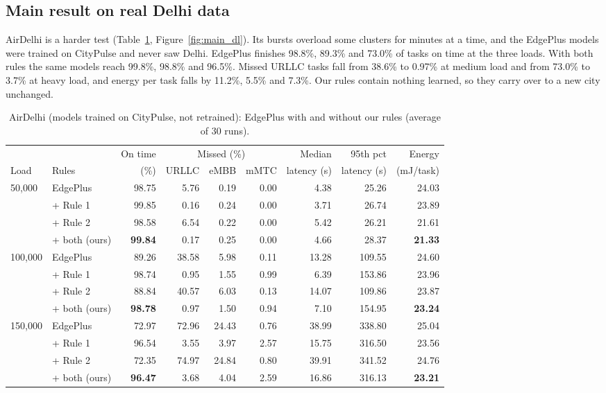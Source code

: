 \documentclass[11pt]{article}
\newcommand{\botrule}{\bottomrule}
\theoremstyle{definition}
\begin{document}
\subsection{Main result on real Delhi data}
AirDelhi is a harder test (Table~\ref{tab:main_dl}, Figure~\ref{fig:main_dl}). Its bursts overload some clusters
for minutes at a time, and the EdgePlus models were trained on CityPulse and never saw Delhi. EdgePlus finishes
98.8\%, 89.3\% and 73.0\% of tasks on time at the three loads. With both rules the same models reach 99.8\%,
98.8\% and 96.5\%. Missed URLLC tasks fall from 38.6\% to 0.97\% at medium load and from 73.0\% to 3.7\% at heavy
load, and energy per task falls by 11.2\%, 5.5\% and 7.3\%. Our rules contain nothing learned, so they carry over
to a new city unchanged.

\begin{table}[!htbp]
\caption{AirDelhi (models trained on CityPulse, not retrained): EdgePlus with and without our rules (average of
30 runs).}
\label{tab:main_dl}
\footnotesize\setlength{\tabcolsep}{4pt}
\begin{tabular*}{\textwidth}{@{\extracolsep\fill}llrrrrrrr@{}}
\toprule
 & & On time & \multicolumn{3}{c}{Missed (\%)} & Median & 95th pct & Energy\\
\cmidrule(lr){4-6}
Load & Rules & (\%) & URLLC & eMBB & mMTC & latency (s) & latency (s) & (mJ/task)\\
\midrule
\multirow{4}{*}{50{,}000} & EdgePlus & 98.75 & 5.76 & 0.19 & 0.00 & 4.38 & 25.26 & 24.03\\
 & + Rule 1 & 99.85 & 0.16 & 0.24 & 0.00 & 3.71 & 26.74 & 23.89\\
 & + Rule 2 & 98.58 & 6.54 & 0.22 & 0.00 & 5.42 & 26.21 & 21.61\\
 & + both (ours) & \textbf{99.84} & 0.17 & 0.25 & 0.00 & 4.66 & 28.37 & \textbf{21.33}\\
\midrule
\multirow{4}{*}{100{,}000} & EdgePlus & 89.26 & 38.58 & 5.98 & 0.11 & 13.28 & 109.55 & 24.60\\
 & + Rule 1 & 98.74 & 0.95 & 1.55 & 0.99 & 6.39 & 153.86 & 23.96\\
 & + Rule 2 & 88.84 & 40.57 & 6.03 & 0.13 & 14.07 & 109.86 & 23.87\\
 & + both (ours) & \textbf{98.78} & 0.97 & 1.50 & 0.94 & 7.10 & 154.95 & \textbf{23.24}\\
\midrule
\multirow{4}{*}{150{,}000} & EdgePlus & 72.97 & 72.96 & 24.43 & 0.76 & 38.99 & 338.80 & 25.04\\
 & + Rule 1 & 96.54 & 3.55 & 3.97 & 2.57 & 15.75 & 316.50 & 23.56\\
 & + Rule 2 & 72.35 & 74.97 & 24.84 & 0.80 & 39.91 & 341.52 & 24.76\\
 & + both (ours) & \textbf{96.47} & 3.68 & 4.04 & 2.59 & 16.86 & 316.13 & \textbf{23.21}\\
\botrule
\end{tabular*}
\end{table}
\end{document}
